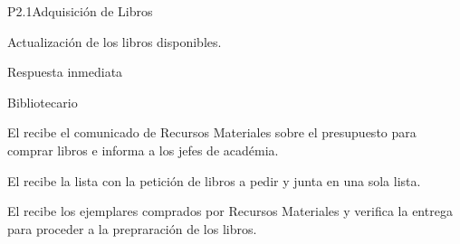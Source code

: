 \begin{Proceso}{P2.1}{Adquisición de Libros}
   { %
  }

   { %
    \begin{UClist}
		\UCli	Actualización de los libros disponibles.
    \end{UClist}
  }

   { %
  }

   { %
    \begin{UClist}
      \UCli Respuesta inmediata
    \end{UClist}
  }
   { %
  }


\end{Proceso}
\begin{PDescripcion}

  \Ppaso Bibliotecario
	\begin{enumerate}
		\Ppaso[\itarea]  El  recibe el comunicado de Recursos Materiales sobre el presupuesto para comprar libros e informa a los jefes de académia.
	\end{enumerate}

	\begin{enumerate}
		\Ppaso[\itarea]  El  recibe la lista con la petición de libros a pedir y junta en una sola lista.
	\end{enumerate}

	\begin{enumerate}
		\Ppaso[\itarea]  El  recibe los ejemplares comprados por Recursos Materiales y verifica la entrega para proceder a la prepraración de los libros.
	\end{enumerate}	
\end{PDescripcion}




